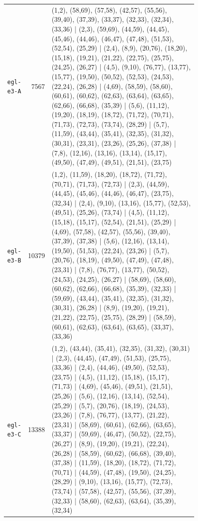 \begin{landscape}
\begin{longtable}{lr>{\tiny\raggedright\arraybackslash}p{0.78\linewidth}}
\texttt{egl-e3-A} & 7567 & (1,2), (58,69), (57,58), (42,57), (55,56), (39,40), (37,39), (33,37), (32,33), (32,34), (33,36) | (2,3), (59,69), (44,59), (44,45), (45,46), (44,46), (46,47), (47,48), (51,53), (52,54), (25,29) | (2,4), (8,9), (20,76), (18,20), (15,18), (19,21), (21,22), (22,75), (25,75), (24,25), (26,27) | (4,5), (9,10), (76,77), (13,77), (15,77), (19,50), (50,52), (52,53), (24,53), (22,24), (26,28) | (4,69), (58,59), (58,60), (60,61), (60,62), (62,63), (63,64), (63,65), (62,66), (66,68), (35,39) | (5,6), (11,12), (19,20), (18,19), (18,72), (71,72), (70,71), (71,73), (72,73), (73,74), (28,29) | (5,7), (11,59), (43,44), (35,41), (32,35), (31,32), (30,31), (23,31), (23,26), (25,26), (37,38) | (7,8), (12,16), (13,16), (13,14), (15,17), (49,50), (47,49), (49,51), (21,51), (23,75) \\[2pt]
\texttt{egl-e3-B} & 10379 & (1,2), (11,59), (18,20), (18,72), (71,72), (70,71), (71,73), (72,73) | (2,3), (44,59), (44,45), (45,46), (44,46), (46,47), (23,75), (32,34) | (2,4), (9,10), (13,16), (15,77), (52,53), (49,51), (25,26), (73,74) | (4,5), (11,12), (15,18), (15,17), (52,54), (21,51), (25,29) | (4,69), (57,58), (42,57), (55,56), (39,40), (37,39), (37,38) | (5,6), (12,16), (13,14), (19,50), (51,53), (22,24), (23,26) | (5,7), (20,76), (18,19), (49,50), (47,49), (47,48), (23,31) | (7,8), (76,77), (13,77), (50,52), (24,53), (24,25), (26,27) | (58,69), (58,60), (60,62), (62,66), (66,68), (35,39), (32,33) | (59,69), (43,44), (35,41), (32,35), (31,32), (30,31), (26,28) | (8,9), (19,20), (19,21), (21,22), (22,75), (25,75), (28,29) | (58,59), (60,61), (62,63), (63,64), (63,65), (33,37), (33,36) \\[2pt]
\texttt{egl-e3-C} & 13388 & (1,2), (43,44), (35,41), (32,35), (31,32), (30,31) | (2,3), (44,45), (47,49), (51,53), (25,75), (33,36) | (2,4), (44,46), (49,50), (52,53), (23,75) | (4,5), (11,12), (15,18), (15,17), (71,73) | (4,69), (45,46), (49,51), (21,51), (25,26) | (5,6), (12,16), (13,14), (52,54), (25,29) | (5,7), (20,76), (18,19), (24,53), (23,26) | (7,8), (76,77), (13,77), (21,22), (23,31) | (58,69), (60,61), (62,66), (63,65), (33,37) | (59,69), (46,47), (50,52), (22,75), (26,27) | (8,9), (19,20), (19,21), (22,24), (26,28) | (58,59), (60,62), (66,68), (39,40), (37,38) | (11,59), (18,20), (18,72), (71,72), (70,71) | (44,59), (47,48), (19,50), (24,25), (28,29) | (9,10), (13,16), (15,77), (72,73), (73,74) | (57,58), (42,57), (55,56), (37,39), (32,33) | (58,60), (62,63), (63,64), (35,39), (32,34) \\[2pt]

\end{longtable}
\end{landscape}
